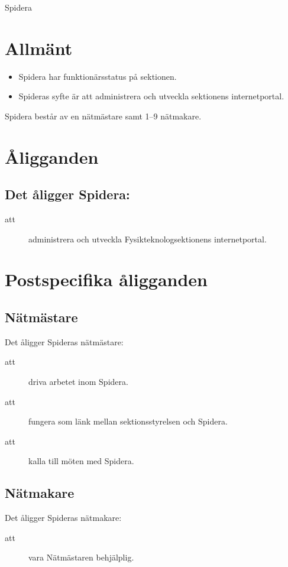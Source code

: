 \documentclass[a4paper]{article}
\begin{document}
\renewcommand{\forening}{Spidera} %

\begin{foreningenv}{\forening{}} %
    \section{Allmänt}
    \begin{itemize}
        \item Spidera har funktionärsstatus på sektionen.
        \item Spideras syfte är att administrera och utveckla sektionens internetportal.
    \end{itemize}
    Spidera består av en nätmästare samt 1--9 nätmakare. 
    
    \section{Åligganden}
    \aliggsektfunkt{}
    
    \subsection{Det åligger Spidera:}
    \begin{description}
        \item[att] administrera och utveckla Fysikteknologsektionens internetportal.
    \end{description}
    
    \section{Postspecifika åligganden}
    \subsection{Nätmästare}
    Det åligger Spideras nätmästare:
    \begin{description}
          \item[att] driva arbetet inom Spidera.
          \item[att] fungera som länk mellan sektionsstyrelsen och Spidera.
          \item[att] kalla till möten med Spidera.
    \end{description}
    
    \subsection{Nätmakare}
    Det åligger Spideras nätmakare:
    \begin{description}
      \item[att] vara Nätmästaren behjälplig.
    \end{description}
\end{foreningenv}
\end{document}
